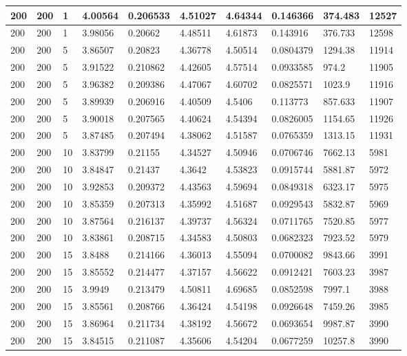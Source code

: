 \begin{landscape}
\begin{longtable}{ | l | l | l | l | l | l | l | l | l | l | }
200 & 200 & 1 & 4.00564 & 0.206533 & 4.51027 & 4.64344 & 0.146366 & 374.483 & 12527\\ \hline
200 & 200 & 1 & 3.98056 & 0.20662 & 4.48511 & 4.61873 & 0.143916 & 376.733 & 12598\\ \hline
200 & 200 & 5 & 3.86507 & 0.20823 & 4.36778 & 4.50514 & 0.0804379 & 1294.38 & 11914\\ \hline
200 & 200 & 5 & 3.91522 & 0.210862 & 4.42605 & 4.57514 & 0.0933585 & 974.2 & 11905\\ \hline
200 & 200 & 5 & 3.96382 & 0.209386 & 4.47067 & 4.60702 & 0.0825571 & 1023.9 & 11916\\ \hline
200 & 200 & 5 & 3.89939 & 0.206916 & 4.40509 & 4.5406 & 0.113773 & 857.633 & 11907\\ \hline
200 & 200 & 5 & 3.90018 & 0.207565 & 4.40624 & 4.54394 & 0.0826005 & 1154.65 & 11926\\ \hline
200 & 200 & 5 & 3.87485 & 0.207494 & 4.38062 & 4.51587 & 0.0765359 & 1313.15 & 11931\\ \hline
200 & 200 & 10 & 3.83799 & 0.21155 & 4.34527 & 4.50946 & 0.0706746 & 7662.13 & 5981\\ \hline
200 & 200 & 10 & 3.84847 & 0.21437 & 4.3642 & 4.53823 & 0.0915744 & 5881.87 & 5972\\ \hline
200 & 200 & 10 & 3.92853 & 0.209372 & 4.43563 & 4.59694 & 0.0849318 & 6323.17 & 5975\\ \hline
200 & 200 & 10 & 3.85359 & 0.207313 & 4.35992 & 4.51687 & 0.0929543 & 5832.87 & 5969\\ \hline
200 & 200 & 10 & 3.87564 & 0.216137 & 4.39737 & 4.56324 & 0.0711765 & 7520.85 & 5977\\ \hline
200 & 200 & 10 & 3.83861 & 0.208715 & 4.34583 & 4.50803 & 0.0682323 & 7923.52 & 5979\\ \hline
200 & 200 & 15 & 3.8488 & 0.214166 & 4.36013 & 4.55094 & 0.0700082 & 9843.66 & 3991\\ \hline
200 & 200 & 15 & 3.85552 & 0.214477 & 4.37157 & 4.56622 & 0.0912421 & 7603.23 & 3987\\ \hline
200 & 200 & 15 & 3.9949 & 0.213479 & 4.50811 & 4.69685 & 0.0852598 & 7997.1 & 3988\\ \hline
200 & 200 & 15 & 3.85561 & 0.208766 & 4.36424 & 4.54198 & 0.0926648 & 7459.26 & 3985\\ \hline
200 & 200 & 15 & 3.86964 & 0.211734 & 4.38192 & 4.56672 & 0.0693654 & 9987.87 & 3990\\ \hline
200 & 200 & 15 & 3.84515 & 0.211087 & 4.35606 & 4.54204 & 0.0677259 & 10257.8 & 3990\\ \hline

\end{longtable}
\end{landscape}
